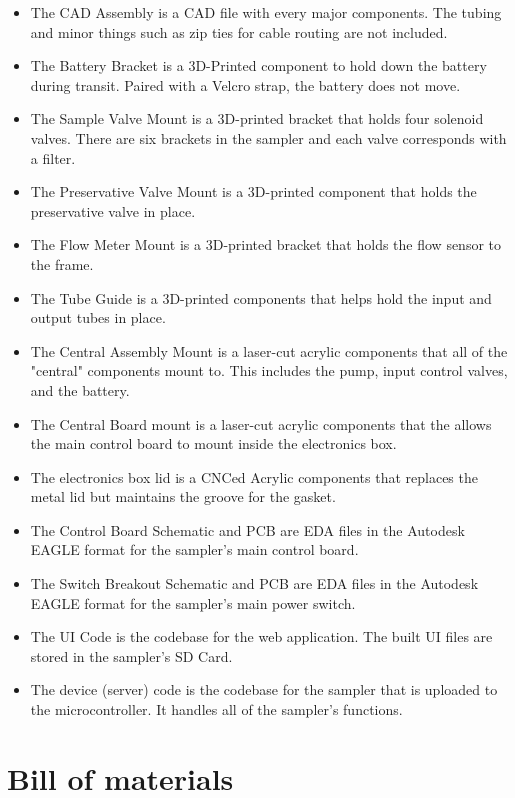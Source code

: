 \documentclass[11pt, letterpaper]{article}
\begin{document}
\vskip 0.3cm
\noindent
\begin{itemize}
	\item 
	The CAD Assembly is a CAD file with every major components. The tubing and minor things such as zip ties for cable routing are not included. 
	\item 
	The Battery Bracket is a 3D-Printed component to hold down the battery during transit. Paired with a Velcro strap, the battery does not move.
	\item 
	The Sample Valve Mount is a 3D-printed bracket that holds four solenoid valves. There are six brackets in the sampler and each valve corresponds with a filter. 
	\item 
	The Preservative Valve Mount is a 3D-printed component that holds the preservative valve in place. 
	\item 
	The Flow Meter Mount is a 3D-printed bracket that holds the flow sensor to the frame.
	\item 
	The Tube Guide is a 3D-printed components that helps hold the input and output tubes in place. 
	\item 
	The Central Assembly Mount is a laser-cut acrylic components that all of the "central" components mount to. This includes the pump, input control valves, and the battery. 
	\item 
	The Central Board mount is a laser-cut acrylic components that the allows the main control board to mount inside the electronics box.
	\item 
	The electronics box lid is a CNCed Acrylic components that replaces the metal lid but maintains the groove for the gasket.
	\item 
	The Control Board Schematic and PCB are EDA files in the Autodesk EAGLE format for the sampler's main control board. 
	\item 
	The Switch Breakout Schematic and PCB are EDA files in the Autodesk EAGLE format for the sampler's main power switch. 
	\item 
	The UI Code is the codebase for the web application. The built UI files are stored in the sampler's SD Card.
	\item 
	The device (server) code is the codebase for the sampler that is uploaded to the microcontroller. It handles all of the sampler's functions.
\end{itemize}

\section{Bill of materials}
\end{document}
